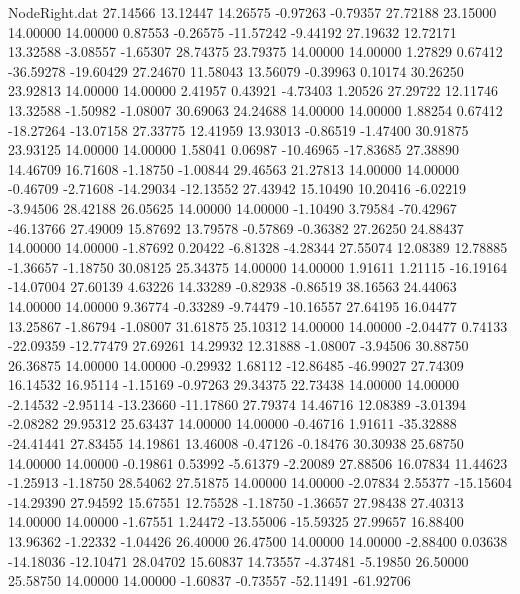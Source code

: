 \begin{filecontents}{NodeRight.dat}
  27.14566   13.12447   14.26575    -0.97263   -0.79357   27.72188   23.15000   14.00000   14.00000    0.87553   -0.26575  -11.57242   -9.44192
  27.19632   12.72171   13.32588    -3.08557   -1.65307   28.74375   23.79375   14.00000   14.00000    1.27829    0.67412  -36.59278  -19.60429
  27.24670   11.58043   13.56079    -0.39963    0.10174   30.26250   23.92813   14.00000   14.00000    2.41957    0.43921   -4.73403    1.20526
  27.29722   12.11746   13.32588    -1.50982   -1.08007   30.69063   24.24688   14.00000   14.00000    1.88254    0.67412  -18.27264  -13.07158
  27.33775   12.41959   13.93013    -0.86519   -1.47400   30.91875   23.93125   14.00000   14.00000    1.58041    0.06987  -10.46965  -17.83685
  27.38890   14.46709   16.71608    -1.18750   -1.00844   29.46563   21.27813   14.00000   14.00000   -0.46709   -2.71608  -14.29034  -12.13552
  27.43942   15.10490   10.20416    -6.02219   -3.94506   28.42188   26.05625   14.00000   14.00000   -1.10490    3.79584  -70.42967  -46.13766
  27.49009   15.87692   13.79578    -0.57869   -0.36382   27.26250   24.88437   14.00000   14.00000   -1.87692    0.20422   -6.81328   -4.28344
  27.55074   12.08389   12.78885    -1.36657   -1.18750   30.08125   25.34375   14.00000   14.00000    1.91611    1.21115  -16.19164  -14.07004
  27.60139    4.63226   14.33289    -0.82938   -0.86519   38.16563   24.44063   14.00000   14.00000    9.36774   -0.33289   -9.74479  -10.16557
  27.64195   16.04477   13.25867    -1.86794   -1.08007   31.61875   25.10312   14.00000   14.00000   -2.04477    0.74133  -22.09359  -12.77479
  27.69261   14.29932   12.31888    -1.08007   -3.94506   30.88750   26.36875   14.00000   14.00000   -0.29932    1.68112  -12.86485  -46.99027
  27.74309   16.14532   16.95114    -1.15169   -0.97263   29.34375   22.73438   14.00000   14.00000   -2.14532   -2.95114  -13.23660  -11.17860
  27.79374   14.46716   12.08389    -3.01394   -2.08282   29.95312   25.63437   14.00000   14.00000   -0.46716    1.91611  -35.32888  -24.41441
  27.83455   14.19861   13.46008    -0.47126   -0.18476   30.30938   25.68750   14.00000   14.00000   -0.19861    0.53992   -5.61379   -2.20089
  27.88506   16.07834   11.44623    -1.25913   -1.18750   28.54062   27.51875   14.00000   14.00000   -2.07834    2.55377  -15.15604  -14.29390
  27.94592   15.67551   12.75528    -1.18750   -1.36657   27.98438   27.40313   14.00000   14.00000   -1.67551    1.24472  -13.55006  -15.59325
  27.99657   16.88400   13.96362    -1.22332   -1.04426   26.40000   26.47500   14.00000   14.00000   -2.88400    0.03638  -14.18036  -12.10471
  28.04702   15.60837   14.73557    -4.37481   -5.19850   26.50000   25.58750   14.00000   14.00000   -1.60837   -0.73557  -52.11491  -61.92706

\end{filecontents}
